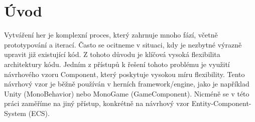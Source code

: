 \chapter{Úvod}


Vytváření her je komplexní proces, který zahrnuje mnoho fází, včetně prototypování a iterací. Často se ocitneme v situaci, kdy je nezbytné výrazně upravit již existující kód. Z tohoto důvodu je klíčová vysoká flexibilita architektury kódu. Jedním z přístupů k řešení tohoto problému je využití návrhového vzoru Component, který poskytuje vysokou míru flexibility. Tento návrhový vzor je běžně používán v herních framework/engine, jako je například Unity (MonoBehavior) nebo MonoGame (GameComponent). Nicméně se v této práci zaměříme na jiný přístup, konkrétně na návrhový vzor Entity-Component-System (ECS).

